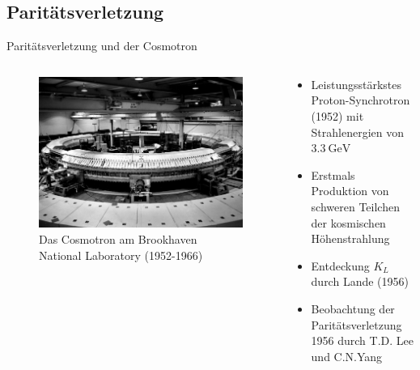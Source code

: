 \documentclass[aspectratio=1610, professionalfonts, 9pt, t]{beamer}
\begin{document}
\subsection{Paritätsverletzung}

  \begin{frame}{Paritätsverletzung und der Cosmotron}
    \begin{columns}[onlytextwidth]
      \begin{column}{0.4\textwidth}
        \begin{figure}[ht]
          \begin{center}
            \includegraphics[height=0.6\textheight]{Images/cosmotron.jpg} %
            \caption{Das Cosmotron am Brookhaven National Laboratory (1952-1966)}
          \end{center}
        \end{figure}
      \end{column}
      \begin{column}{0.5\textwidth}
        \begin{itemize}
          \item Leistungsstärkstes Proton-Synchrotron (1952) mit Strahlenergien von $\SI{3.3}{\giga\electronvolt}$
          \item Erstmals Produktion von schweren Teilchen der kosmischen Höhenstrahlung
          \item Entdeckung $K_{L}$ durch Lande (1956) %
          \item Beobachtung der Paritätsverletzung 1956 durch T.D. Lee und C.N.Yang
          \begin{equation*}

\end{equation*}
\end{itemize}
\end{column}
\end{columns}
\end{frame}
\end{document}
